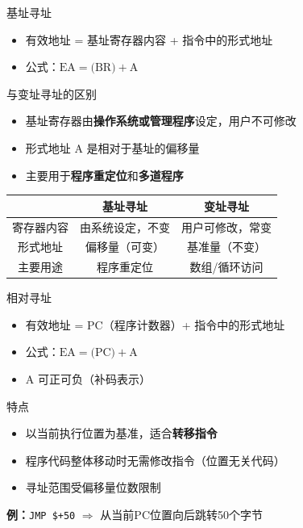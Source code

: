\documentclass[10pt, aspectratio=169]{beamer}
\begin{document}
\begin{frame}{基址寻址}
    \begin{itemize}
        \item 有效地址 = 基址寄存器内容 + 指令中的形式地址
        \item 公式：$\text{EA} = \text{(BR)} + \text{A}$
    \end{itemize}
    \vspace{0.3em}
    \begin{block}{与变址寻址的区别}
        \begin{itemize}
            \item 基址寄存器由\textbf{操作系统或管理程序}设定，用户不可修改
            \item 形式地址 A 是相对于基址的偏移量
            \item 主要用于\textbf{程序重定位}和\textbf{多道程序}
        \end{itemize}
    \end{block}
    \vspace{0.3em}
    \begin{tabular}{|c|c|c|}
        \hline
        & \textbf{基址寻址} & \textbf{变址寻址} \\
        \hline
        寄存器内容 & 由系统设定，不变 & 用户可修改，常变 \\
        形式地址 & 偏移量（可变） & 基准量（不变） \\
        主要用途 & 程序重定位 & 数组/循环访问 \\
        \hline
    \end{tabular}
\end{frame}

\begin{frame}{相对寻址}
    \begin{itemize}
        \item 有效地址 = PC（程序计数器）+ 指令中的形式地址
        \item 公式：$\text{EA} = \text{(PC)} + \text{A}$
        \item A 可正可负（补码表示）
    \end{itemize}
    \vspace{0.3em}
    \begin{block}{特点}
        \begin{itemize}
            \item[+] 以当前执行位置为基准，适合\textbf{转移指令}
            \item[+] 程序代码整体移动时无需修改指令（位置无关代码）
            \item[-] 寻址范围受偏移量位数限制
        \end{itemize}
    \end{block}
    \vspace{0.3em}
    \textbf{例：}\texttt{JMP \$+50} $\Rightarrow$ 从当前PC位置向后跳转50个字节
\end{frame}
\end{document}
